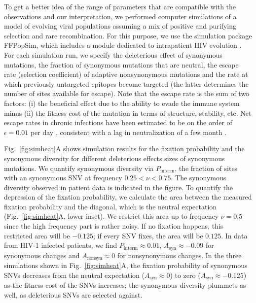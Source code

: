 \documentclass[11pt]{article}
\newcommand{\FIG}[1]{Fig.~\ref{fig:#1}}
\begin{document}
To get a better idea of the range of parameters that are compatible with the
observations and our interpretation, we performed computer simulations of
a model of evolving viral populations assuming a mix of positive and purifying selection
and rare recombination.  For this purpose, we use the simulation package
FFPopSim, which includes a module dedicated to intrapatient HIV evolution
\citep{zanini_ffpopsim:_2012}. For each simulation run, we specify the
deleterious effect of synonymous mutations, the fraction of synonymous mutations
that are neutral, the escape rate (selection coefficient) of adaptive
nonsynonymous mutations and the rate at which previously untargeted epitopes
become targeted (the latter determines the number of sites available for
escape). Note that the escape rate is the sum of two factors: (i) the beneficial
effect due to the ability to evade the immune system minus (ii) the fitness cost
of the mutation in terms of structure, stability, etc. Net escape rates in
chronic infections have been estimated to be on the order of $\epsilon = 0.01$
per day \citep{neher_recombination_2010, Asquith:2006p28003}, consistent
with a lag in neutralization of a few month \citep{richman_rapid_2003}.

\FIG{simheat}A shows simulation results for the fixation probability and the
synonymous diversity for different deleterious effects sizes of synonymous mutations.
We quantify synonymous diversity via $P_\mathrm{interm}$, the fraction of sites
with an synonymous SNV at frequency $0.25 < \nu < 0.75$. The synonymous diversity
observed in patient data is indicated in the figure. To quantify the depression
of the fixation probability, we calculate the area between the measured fixation
probability and the diagonal, which is the neutral expectation
(\FIG{simheat}A, lower inset). We restrict this area up to frequency
$\nu=0.5$ since the high frequency part is rather noisy.
If no fixation happens, this restricted area will be
$-0.125$; if every SNV fixes, the area will be $0.125$. In data from HIV-1 infected
patients, we find $P_\mathrm{interm} \approx 0.01$, $A_\mathrm{syn} \approx -0.09$
for synonymous changes and $A_\mathrm{nonsyn} \approx 0$ for nonsynonymous
changes. In the three simulations shown in \FIG{simheat}A, the fixation
probability of synonymous SNVs decreases from the neutral expectation
($A_\mathrm{syn} \approx 0$) to zero ($A_\mathrm{syn} \approx -0.125$) as the
fitness cost of the SNVs increases; the synonymous diversity plummets as well, as
deleterious SNVs are selected against.
\end{document}
